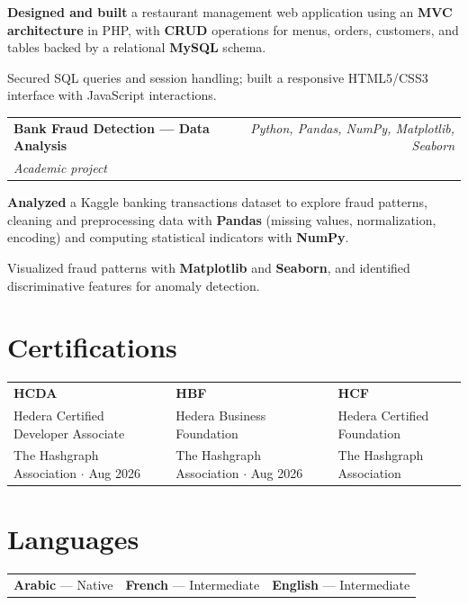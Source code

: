 \documentclass[a4paper,10pt]{article}
\makeatletter
\newcommand{\entry}[3]{%
  \noindent
  \begin{tabularx}{\linewidth}{@{}X r@{}}
    \textbf{#1} & \textcolor{muted}{\textit{#2}}\\
    \textcolor{muted}{\textit{#3}} &
  \end{tabularx}
  \vspace{1pt}
}
\makeatother
\begin{document}
\begin{cvitems}
  \item \textbf{Designed and built} a restaurant management web application using an \textbf{MVC architecture} in PHP, with \textbf{CRUD} operations for menus, orders, customers, and tables backed by a relational \textbf{MySQL} schema.
  \item Secured SQL queries and session handling; built a responsive HTML5/CSS3 interface with JavaScript interactions.
\end{cvitems}

\vspace{3pt}

\entry{Bank Fraud Detection --- Data Analysis}
      {Python, Pandas, NumPy, Matplotlib, Seaborn}
      {Academic project}

\begin{cvitems}
  \item \textbf{Analyzed} a Kaggle banking transactions dataset to explore fraud patterns, cleaning and preprocessing data with \textbf{Pandas} (missing values, normalization, encoding) and computing statistical indicators with \textbf{NumPy}.
  \item Visualized fraud patterns with \textbf{Matplotlib} and \textbf{Seaborn}, and identified discriminative features for anomaly detection.
\end{cvitems}

\section*{Certifications}

\noindent
\begin{tabularx}{\linewidth}{@{}XXX@{}}
  \textbf{HCDA} & \textbf{HBF} & \textbf{HCF}\\
  Hedera Certified Developer Associate &
  Hedera Business Foundation &
  Hedera Certified Foundation\\
  \textcolor{muted}{The Hashgraph Association $\cdot$ Aug 2026} &
  \textcolor{muted}{The Hashgraph Association $\cdot$ Aug 2026} &
  \textcolor{muted}{The Hashgraph Association}
\end{tabularx}

\section*{Languages}

\noindent
\begin{tabularx}{\linewidth}{@{}p{4cm}p{4cm}p{4cm}@{}}
  \textbf{Arabic} --- Native &
  \textbf{French} --- Intermediate &
  \textbf{English} --- Intermediate
\end{tabularx}
\end{document}
